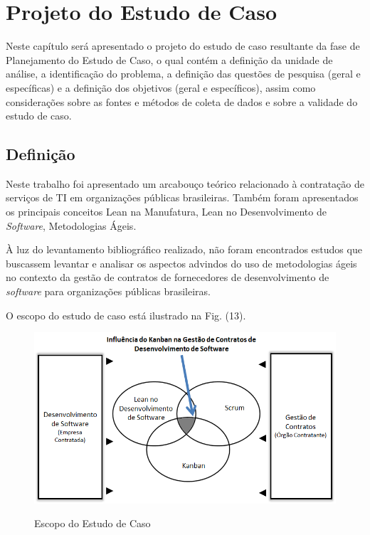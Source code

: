 \chapter[Projeto do Estudo de Caso]{Projeto do Estudo de Caso}

Neste capítulo será apresentado o projeto do estudo de caso resultante da fase de Planejamento do Estudo de Caso, o qual contém a definição da unidade de análise,  a identificação do problema, a definição das questões de pesquisa (geral e específicas) e a definição dos objetivos (geral e específicos), assim como considerações sobre as fontes e métodos de coleta de dados e sobre a validade do estudo de caso.

\section[Definição]{Definição}

Neste trabalho foi apresentado um arcabouço teórico relacionado à contratação de serviços de TI em organizações públicas brasileiras. Também foram apresentados os principais conceitos Lean na Manufatura, Lean no Desenvolvimento de \textit{Software}, Metodologias Ágeis.

À luz do levantamento bibliográfico realizado, não foram encontrados estudos que buscassem levantar e analisar os aspectos advindos do uso de metodologias ágeis no contexto da gestão de contratos de fornecedores de desenvolvimento de \textit{software} para organizações públicas brasileiras.


O escopo do estudo de caso está ilustrado na Fig. (13). 
\begin{figure}[H]
		\centering
		
			\includegraphics[scale=0.8]{figuras/escopoEC.png}
		\label{escopo}
		\caption{Escopo do Estudo de Caso}
		
\end{figure}

